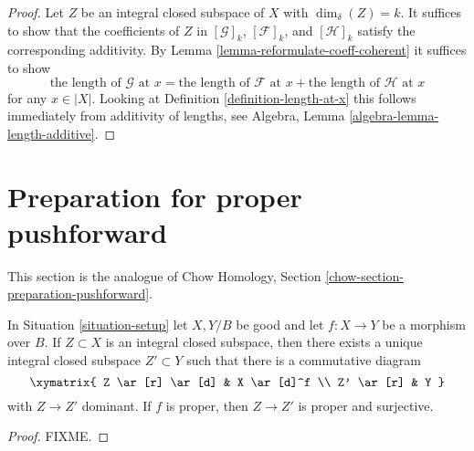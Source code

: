 \begin{proof}
Let $Z$ be an integral closed subspace of $X$ with $\dim_\delta(Z) = k$.
It suffices to show that the coefficients of
$Z$ in $[\mathcal{G}]_k$, $[\mathcal{F}]_k$, and $[\mathcal{H}]_k$
satisfy the corresponding additivity. By
Lemma \ref{lemma-reformulate-coeff-coherent}
it suffices to show
$$
\text{the length of }\mathcal{G}\text{ at }x =
\text{the length of }\mathcal{F}\text{ at }x +
\text{the length of }\mathcal{H}\text{ at }x
$$
for any $x \in |X|$. Looking at Definition \ref{definition-length-at-x}
this follows immediately from additivity of lengths, see
Algebra, Lemma \ref{algebra-lemma-length-additive}.
\end{proof}





\section{Preparation for proper pushforward}
\label{section-preparation-pushforward}

\noindent
This section is the analogue of
Chow Homology, Section \ref{chow-section-preparation-pushforward}.

\begin{lemma}
\label{lemma-proper-image}
In Situation \ref{situation-setup} let $X,Y/B$ be good and let $f : X \to Y$
be a morphism over $B$. If $Z \subset X$ is an integral closed subspace, then
there exists a unique integral closed subspace $Z' \subset Y$ such that there
is a commutative diagram
$$
\xymatrix{
Z \ar[r] \ar[d] & X \ar[d]^f \\
Z' \ar[r] & Y
}
$$
with $Z \to Z'$ dominant. If $f$ is proper, then $Z \to Z'$ is proper
and surjective.
\end{lemma}

\begin{proof}
FIXME.
\end{proof}
















